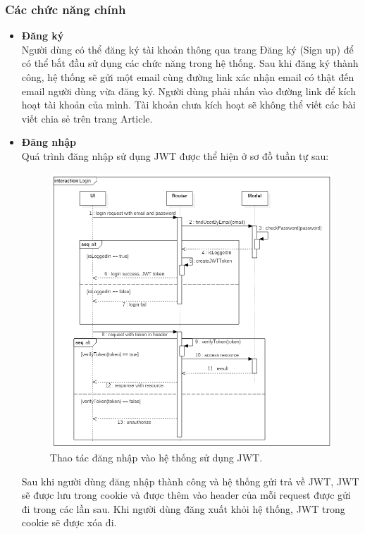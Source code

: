 \documentclass[a4paper,12pt,oneside]{article}
\begin{document}
\subsubsection{Các chức năng chính}

\begin{itemize}
	\item \textbf{Đăng ký}\\
	Người dùng có thể đăng ký tài khoản thông qua trang Đăng ký (Sign up) để có thể bắt đầu sử dụng các chức năng trong hệ thống. Sau khi đăng ký thành công, hệ thống sẽ gửi một email cùng đường link xác nhận email có thật đến email người dùng vừa đăng ký. Người dùng phải nhấn vào đường link để kích hoạt tài khoản của mình. Tài khoản chưa kích hoạt sẽ không thể viết các bài viết chia sẻ trên trang Article.
	\item \textbf{Đăng nhập}\\
	Quá trình đăng nhập sử dụng JWT được thể hiện ở sơ đồ tuần tự sau:
	
	\begin{figure}[H]
		\centering
		\includegraphics[scale=.55]{hinh/seq-login.png}
		\caption{Thao tác đăng nhập vào hệ thống sử dụng JWT.}
	\end{figure}	
	
	Sau khi người dùng đăng nhập thành công và hệ thống gửi trả về JWT, JWT sẽ được lưu trong cookie và được thêm vào header của mỗi request được gửi đi trong các lần sau. Khi người dùng đăng xuất khỏi hệ thống, JWT trong cookie sẽ được xóa đi.
	

\end{itemize}
\end{document}
